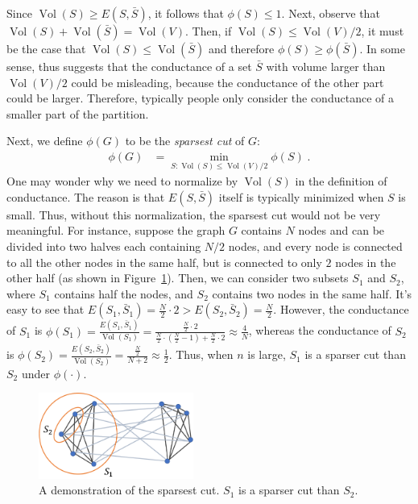 Since $\operatorname{Vol}(S) \geq E(S, \bar{S})$, it follows that $\phi(S) \leq 1$. Next, observe that $\operatorname{Vol}(S) + \operatorname{Vol}(\bar{S}) = \operatorname{Vol}(V)$. Then, if $\operatorname{Vol}(S) \leq \operatorname{Vol}(V)/2$, it must be the case that $\operatorname{Vol}(S) \leq \operatorname{Vol}(\bar{S})$ and therefore $\phi(S) \geq \phi(\bar{S})$. In some sense, thus suggests that the conductance of a set $\bar{S}$ with volume larger than $\operatorname{Vol}(V)/2$ could be misleading, because the conductance of the other part could be larger. Therefore, typically people only consider the conductance of a smaller part of the partition. 

Next, we define $\phi(G)$ to be the {\it sparsest cut} of $G$:
\begin{align}
    \phi(G) &= \min_{S: \operatorname{Vol}(S) \leq \operatorname{Vol}(V)/2} \phi(S) \;.
\end{align}
One may wonder why we need to normalize by $\operatorname{Vol}(S)$ in the definition of conductance. The reason is that $E(S, \bar{S})$ itself is typically minimized when $S$ is small. Thus, without this normalization, the sparsest cut would not be very meaningful. For instance, suppose the graph $G$ contains $N$ nodes and can be divided into two halves each containing $N/2$ nodes, and every node is connected to all the other nodes in the same half, but is connected to only $2$ nodes in the other half (as shown in Figure~\ref{fig:ssl1}). Then, we can consider two subsets $S_1$ and $S_2$, where $S_1$ contains half the nodes, and $S_2$ contains two nodes in the same half. It's easy to see that $E(S_1, \bar{S}_1) = \frac{N}{2}\cdot 2 > E(S_2, \bar{S}_2) = \frac{N}{2}$. However, the conductance of $S_1$ is $\phi(S_1) = \frac{E(S_1, \bar{S}_1)}{\operatorname{Vol}(S_1)} = \frac{\frac{N}{2}\cdot 2}{\frac{N}{2}\cdot(\frac{N}{2}-1)+\frac{N}{2}\cdot 2}\approx\frac{4}{N}$, whereas the conductance of $S_2$ is $\phi(S_2) = \frac{E(S_2, \bar{S}_2)}{\operatorname{Vol}(S_2)}=\frac{\frac{N}{2}}{N+2} \approx\frac{1}{2}$. Thus, when $n$ is large, $S_1$ is a sparser cut than $S_2$ under $\phi(\cdot)$. 


\begin{figure}[ht]
	\centering
	\includegraphics[width=2in]{figures/ssl3.pdf}
	\caption{A demonstration of the sparsest cut. $S_1$ is a sparser cut than $S_2$.}
	\label{fig:ssl1}
\end{figure}


